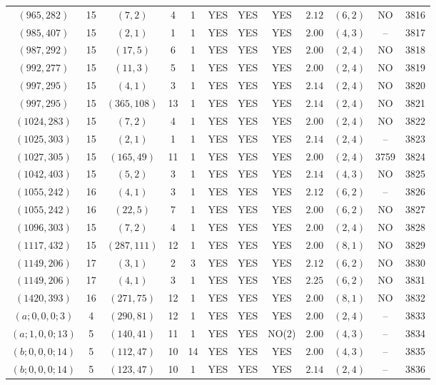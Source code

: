 \begin{longtable}{|c|c|c|c|c|c|c|c|c|c|c|c|}
$(965,282)$ & 15 & $(7,2)$ & 4 & 1 & YES & YES & YES & $2.12$ & $(6,2)$ & NO & 3816\\
$(985,407)$ & 15 & $(2,1)$ & 1 & 1 & YES & YES & YES & $2.00$ & $(4,3)$ & -- & 3817\\
$(987,292)$ & 15 & $(17,5)$ & 6 & 1 & YES & YES & YES & $2.00$ & $(2,4)$ & NO & 3818\\
$(992,277)$ & 15 & $(11,3)$ & 5 & 1 & YES & YES & YES & $2.00$ & $(2,4)$ & NO & 3819\\
$(997,295)$ & 15 & $(4,1)$ & 3 & 1 & YES & YES & YES & $2.14$ & $(2,4)$ & NO & 3820\\
$(997,295)$ & 15 & $(365,108)$ & 13 & 1 & YES & YES & YES & $2.14$ & $(2,4)$ & NO & 3821\\
$(1024,283)$ & 15 & $(7,2)$ & 4 & 1 & YES & YES & YES & $2.00$ & $(2,4)$ & NO & 3822\\
$(1025,303)$ & 15 & $(2,1)$ & 1 & 1 & YES & YES & YES & $2.14$ & $(2,4)$ & -- & 3823\\
$(1027,305)$ & 15 & $(165,49)$ & 11 & 1 & YES & YES & YES & $2.00$ & $(2,4)$ & 3759 & 3824\\
$(1042,403)$ & 15 & $(5,2)$ & 3 & 1 & YES & YES & YES & $2.14$ & $(4,3)$ & NO & 3825\\
$(1055,242)$ & 16 & $(4,1)$ & 3 & 1 & YES & YES & YES & $2.12$ & $(6,2)$ & -- & 3826\\
$(1055,242)$ & 16 & $(22,5)$ & 7 & 1 & YES & YES & YES & $2.00$ & $(6,2)$ & NO & 3827\\
$(1096,303)$ & 15 & $(7,2)$ & 4 & 1 & YES & YES & YES & $2.00$ & $(2,4)$ & NO & 3828\\
$(1117,432)$ & 15 & $(287,111)$ & 12 & 1 & YES & YES & YES & $2.00$ & $(8,1)$ & NO & 3829\\
$(1149,206)$ & 17 & $(3,1)$ & 2 & 3 & YES & YES & YES & $2.12$ & $(6,2)$ & NO & 3830\\
$(1149,206)$ & 17 & $(4,1)$ & 3 & 1 & YES & YES & YES & $2.25$ & $(6,2)$ & NO & 3831\\
$(1420,393)$ & 16 & $(271,75)$ & 12 & 1 & YES & YES & YES & $2.00$ & $(8,1)$ & NO & 3832\\
$(a;0,0,0;3)$ & 4 & $(290,81)$ & 12 & 1 & YES & YES & YES & $2.00$ & $(2,4)$ & -- & 3833\\
$(a;1,0,0;13)$ & 5 & $(140,41)$ & 11 & 1 & YES & YES & NO(2) & $2.00$ & $(4,3)$ & -- & 3834\\
$(b;0,0,0;14)$ & 5 & $(112,47)$ & 10 & 14 & YES & YES & YES & $2.00$ & $(4,3)$ & -- & 3835\\
$(b;0,0,0;14)$ & 5 & $(123,47)$ & 10 & 1 & YES & YES & YES & $2.14$ & $(2,4)$ & -- & 3836\\

\end{longtable}
